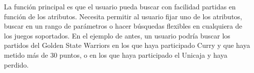 La función principal es que el usuario pueda buscar con facilidad partidas en función de los atributos. Necesita permitir al usuario fijar uno de los atributos, buscar en un rango de parámetros o hacer búsquedas flexibles en cualquiera de los juegos soportados. En el ejemplo de antes, un usuario podría buscar los partidos del Golden State Warriors en los que haya participado Curry y que haya metido más de 30 puntos, o en los que haya participado el Unicaja y haya perdido.
